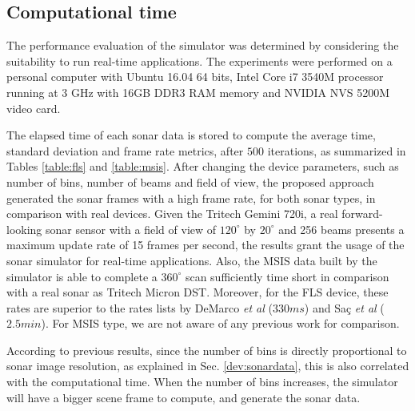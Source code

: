\documentclass[final,5p,times]{elsarticle}
\begin{document}
\subsection{Computational time}

The performance evaluation of the simulator was determined by considering the suitability to run real-time applications. The experiments were performed on a personal computer with Ubuntu 16.04 64 bits, Intel Core i7 3540M processor running at 3 GHz with 16GB DDR3 RAM memory and NVIDIA NVS 5200M video card.

The elapsed time of each sonar data is stored to compute the average time, standard deviation and frame rate metrics, after $500$ iterations, as summarized in Tables \ref{table:fls} and \ref{table:msis}. After changing the device parameters, such as number of bins, number of beams and field of view, the proposed approach generated the sonar frames with a high frame rate, for both sonar types, in comparison with real devices. Given the Tritech Gemini 720i, a real forward-looking sonar sensor with a field of view of $120^{\circ}$ by $20^{\circ}$ and 256 beams presents a maximum update rate of 15 frames per second, the results grant the usage of the sonar simulator for real-time applications. Also, the MSIS data built by the simulator is able to complete a $360^{\circ}$ scan sufficiently time short in comparison with a real sonar as Tritech Micron DST. Moreover, for the FLS device, these rates are superior to the rates lists by DeMarco \textit{et al} \cite{demarco2015} ($330 ms$) and Saç \textit{et al} \cite{sac2015} ($2.5 min$). For MSIS type, we are not aware of any previous work for comparison.

According to previous results, since the number of bins is directly proportional to sonar image resolution, as explained in Sec. \ref{dev:sonardata}, this is also correlated with the computational time. When the number of bins increases, the simulator will have a bigger scene frame to compute, and generate the sonar data.
\end{document}
